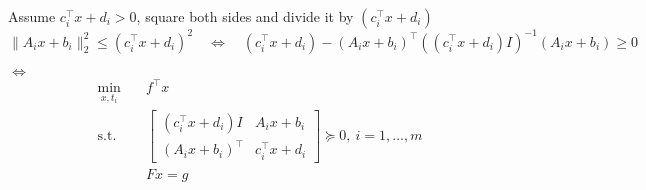 \documentclass[11pt]{article}
\newcommand{\T}{^\top}
\begin{document}
Assume $c_i\T x + d_i > 0$, square both sides and divide it by $(c_i\T x + d_i)$
\[
  \|A_ix + b_i\|_2^2 \leq (c_i\T x + d_i)^2 
  \quad \Leftrightarrow \quad
  (c_i\T x + d_i) - (A_ix + b_i)\T ((c_i\T x + d_i)I)^{-1} (A_ix + b_i) \geq 0
\]

$\Leftrightarrow$
\begin{align*}
  \min_{x, t_i} \quad & f\T x\\
  \text{s.t.}\quad 
  & \begin{bmatrix}
    (c_i\T x + d_i) I & A_i x + b_i\\ (A_i x + b_i)\T & c_i\T x + d_i
  \end{bmatrix} \succeq 0,\ i=1, \dots, m\\
  & Fx = g
\end{align*}
\end{document}
